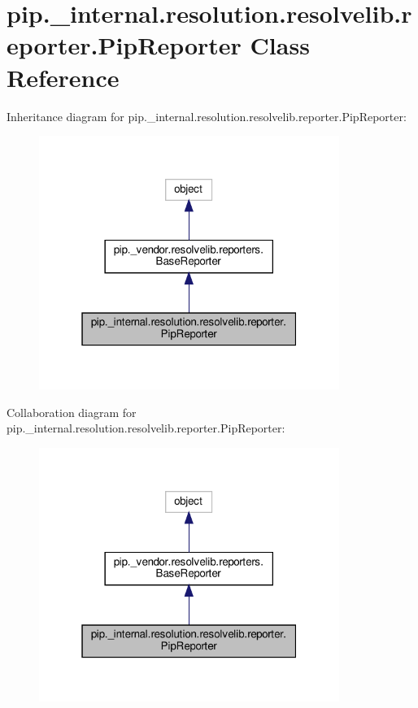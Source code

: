 \hypertarget{classpip_1_1__internal_1_1resolution_1_1resolvelib_1_1reporter_1_1PipReporter}{}\section{pip.\+\_\+internal.\+resolution.\+resolvelib.\+reporter.\+Pip\+Reporter Class Reference}
\label{classpip_1_1__internal_1_1resolution_1_1resolvelib_1_1reporter_1_1PipReporter}


Inheritance diagram for pip.\+\_\+internal.\+resolution.\+resolvelib.\+reporter.\+Pip\+Reporter\+:
\nopagebreak
\begin{figure}[H]
\begin{center}
\leavevmode
\includegraphics[width=277pt]{classpip_1_1__internal_1_1resolution_1_1resolvelib_1_1reporter_1_1PipReporter__inherit__graph}
\end{center}
\end{figure}


Collaboration diagram for pip.\+\_\+internal.\+resolution.\+resolvelib.\+reporter.\+Pip\+Reporter\+:
\nopagebreak
\begin{figure}[H]
\begin{center}
\leavevmode
\includegraphics[width=277pt]{classpip_1_1__internal_1_1resolution_1_1resolvelib_1_1reporter_1_1PipReporter__coll__graph}
\end{center}
\end{figure}
